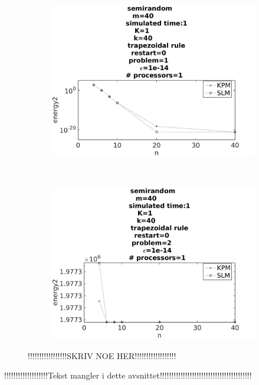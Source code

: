 \begin{figure}[H]
        \centering
        \begin{subfigure}[b]{0.45\textwidth}
                \includegraphics[width=\textwidth]{../MATLAB/fig/restartenergyprob1.jpg}
                \caption{  }
                \label{fig:restarttimeprob1}
        \end{subfigure}
        ~
        \begin{subfigure}[b]{0.45\textwidth}
                \includegraphics[width=\textwidth]{../MATLAB/fig/restartenergyprob2.jpg}
                \caption{  }
                \label{fig:restarttimeprob2}
        \end{subfigure}
        \caption{ !!!!!!!!!!!!!!!!!SKRIV NOE HER!!!!!!!!!!!!!!!!!!  }
        \label{fig:restarttimeprob}
\end{figure}
!!!!!!!!!!!!!!!!!!!Tekst mangler i dette avsnittet!!!!!!!!!!!!!!!!!!!!!!!!!!!!!!!!!!!!!!!!\\
